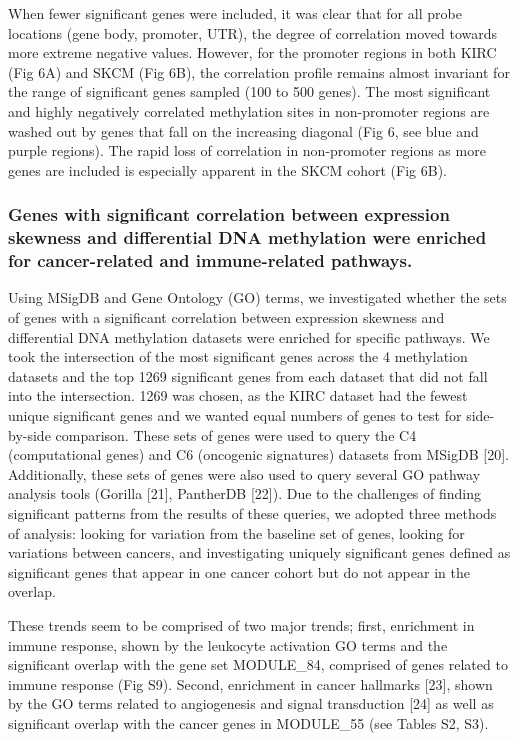 \documentclass[11pt]{article}
\begin{document}
When fewer significant genes were included, it was clear that for all probe locations (gene body, promoter, UTR), the degree of correlation moved towards more extreme negative values. However, for the promoter regions in both KIRC (Fig 6A) and SKCM (Fig 6B), the correlation profile remains almost invariant for the range of significant genes sampled (100 to 500 genes). The most significant and highly negatively correlated methylation sites in non-promoter regions are washed out by genes that fall on the increasing diagonal (Fig 6, see blue and purple regions). The rapid loss of correlation in non-promoter regions as more genes are included is especially apparent in the SKCM cohort (Fig 6B).

\subsubsection*{Genes with significant correlation between expression skewness and differential DNA methylation were enriched for cancer-related and immune-related pathways.}

Using MSigDB and Gene Ontology (GO) terms, we investigated whether the sets of genes with a significant correlation between expression skewness and differential DNA methylation datasets were enriched for specific pathways. We took the intersection of the most significant genes across the 4 methylation datasets and the top 1269 significant genes from each dataset that did not fall into the intersection. 1269 was chosen, as the KIRC dataset had the fewest unique significant genes and we wanted equal numbers of genes to test for side-by-side comparison. These sets of genes were used to query the C4 (computational genes) and C6 (oncogenic signatures) datasets from MSigDB [20]. Additionally, these sets of genes were also used to query several GO pathway analysis tools (Gorilla [21], PantherDB [22]). Due to the challenges of finding significant patterns from the results of these queries, we adopted three methods of analysis: looking for variation from the baseline set of genes, looking for variations between cancers, and investigating uniquely significant genes defined as significant genes that appear in one cancer cohort but do not appear in the overlap.
\newline

These trends seem to be comprised of two major trends; first, enrichment in immune response, shown by the leukocyte activation GO terms and the significant overlap with the gene set MODULE\_84, comprised of genes related to immune response (Fig S9). Second, enrichment in cancer hallmarks [23], shown by the GO terms related to angiogenesis and signal transduction [24] as well as significant overlap with the cancer genes in MODULE\_55 (see Tables S2, S3). 
\end{document}
